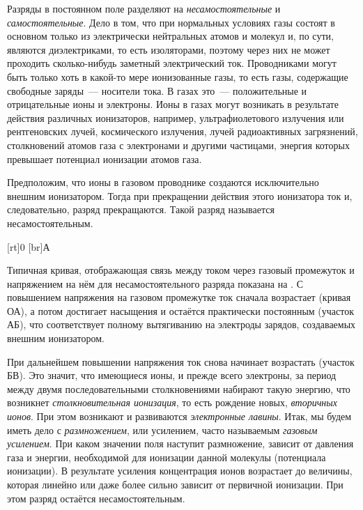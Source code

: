 Разряды в постоянном поле разделяют на \textit{несамостоятельные} и \textit{самостоятельные}. Дело в том, что при нормальных
условиях газы состоят в основном только из электрически нейтральных атомов и молекул и, по сути, являются диэлектриками,
то есть изоляторами, поэтому через них не может проходить сколько-нибудь заметный электрический ток. Проводниками могут
быть только хоть в какой-то мере ионизованные газы, то есть газы, содержащие свободные заряды~--- носители тока. В газах
это~--- положительные и отрицательные ионы и электроны. Ионы в газах могут возникать в результате действия различных
ионизаторов, например, ультрафиолетового излучения или рентгеновских лучей, космического излучения, лучей радиоактивных
загрязнений, столкновений атомов газа с электронами и другими частицами, энергия которых превышает потенциал ионизации
атомов газа.

Предположим, что ионы в газовом проводнике создаются исключительно внешним ионизатором. Тогда при прекращении действия
этого ионизатора ток и, следовательно, разряд прекращаются. Такой разряд называется несамостоятельным.

{
[rt]{0}
[br]{А}
}


Типичная кривая, отображающая связь между током через газовый промежуток и напряжением на нём для несамостоятельного разряда показана на . С повышением напряжения
на газовом промежутке ток сначала возрастает (кривая ОА), а потом достигает насыщения и остаётся практически постоянным
(участок АБ), что соответствует полному вытягиванию на электроды зарядов, создаваемых внешним ионизатором.

При дальнейшем повышении напряжения ток снова начинает возрастать (участок БВ). Это значит, что имеющиеся ионы, и прежде
всего электроны, за период между двумя последовательными столкновениями набирают такую энергию, что возникнет
\textit{столкновительная ионизация}, то есть рождение новых, {\em вторичных ионов}. При этом возникают и развиваются
\textit{электронные лавины}. Итак, мы будем иметь дело с {\em размножением}, или усилением, часто называемым {\em газовым
усилением}. При каком значении поля наступит размножение, зависит от давления газа и энергии, необходимой для ионизации
данной молекулы (потенциала ионизации). В результате усиления концентрация ионов возрастает до величины, которая линейно
или даже более сильно зависит от первичной ионизации. При этом разряд остаётся несамостоятельным.

